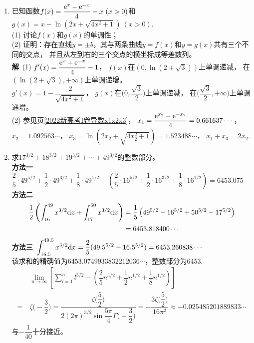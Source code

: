 \begin{enumerate}[label={\textbf{\arabic*.}},leftmargin=
    \inteval{\myenumleftmargin}pt]
\item 已知函数$f(x)=\dfrac{\mathrm{e}^x-\mathrm{e}^{-x}}{4}-x\ (x>0) $和
$ g(x)=x-\ln(2x+\sqrt{4x^2+1})\ (x>0) $. \\
(1) 讨论$ f(x) $和$ g(x) $的单调性；\\
(2) 证明：存在直线$y=\pm b$，其与两条曲线$y=f(x)$和$y=g(x)$共有三个不同的交点，
并且从左到右的三个交点的横坐标成等差数列。\\
\textbf{解}\ (1) $ f'(x)=\dfrac{\mathrm{e}^x+\mathrm{e}^{-x}}{4}-1 $，
$ f(x) $在$ (0,\ln(2+\sqrt{3})) $上单调递减，
在$ (\ln(2+\sqrt{3}),+\infty) $上单调递增。\\
$ g'(x)=1-\dfrac{2}{\sqrt{4x^2+1}} $，
$ g(x) $在$ \Big(0,\dfrac{\sqrt{3}}{2}\Big) $上单调递减，
在$ \Big(\dfrac{\sqrt{3}}{2},+\infty\Big) $上单调递增。\\
(2) 参见\pageref{2022新高考I卷导数x1x2x3}页\ref{2022新高考I卷导数x1x2x3}，
$ x_1=\dfrac{\mathrm{e}^{x_2}-\mathrm{e}^{-x_2}}{4}=0.661637\cdots $，\\
$ x_2=1.092563\cdots $，
$ x_3=\ln(2x_2+\sqrt{4x_2^2+1})=1.523488\cdots $，
$ x_1+x_3=2x_2 $.

\item 求$ 17^{3/2}+18^{3/2}+19^{3/2}+\cdots + 49^{3/2} $的整数部分。
\ifteach \\ 
\textbf{方法一}\ 
$ \dfrac{2}{5}\cdot 49^{5/2}+\dfrac{1}{2}\cdot 49^{3/2}+\dfrac{1}{8}
\cdot 49^{1/2}-\left(
\dfrac{2}{5}\cdot 16^{5/2}+\dfrac{1}{2}\cdot 16^{3/2}+\dfrac{1}{8}\cdot 16^{1/2}\right)=6453.075 $  \\
\textbf{方法二}\ 
\begin{align*}
    \dfrac{1}{2}\left(\int_{16}^{49}x^{3/2}\mathrm{d} x+\int_{17}^{50}x^{3/2}
    \mathrm{d} x \right) &= \dfrac{1}{5}\left( 49^{5/2} -16^{5/2}+50^{5/2}-17^{5/2} 
    \right)\\ &= 6453.818400 \cdots
\end{align*}
\textbf{方法三}\ $ \displaystyle \int_{16.5}^{49.5}x^{3/2}\mathrm{d} x=
\dfrac{2}{5}(49.5^{5/2}-16.5^{5/2})=6453.260838 \cdots $ \\
该求和的精确值为$ 6453.0749933832212036\cdots $，整数部分为6453. \\
\begin{align*}
    &\ \lim\limits_{n\to \infty} \left[ \sum\limits_{l=1}^{n} l^{3/2}-
     \left(\dfrac{2}{5}n^{5/2}+\dfrac{1}{2}n^{1/2}+\dfrac{1}{8}n^{1/2}
     \right)\right]\\ 
     =&\ \zeta\Big(-\dfrac{3}{2}\Big)=\dfrac{\zeta\Big(\dfrac{5}{2}\Big)}
    {2(2\pi)^{3/2}\sin\dfrac{5\pi}{4}\Gamma\Big(-\dfrac{3}{2}\Big)}
    =-\dfrac{3\zeta\Big(\dfrac{5}{2}\Big)}{16\pi^2} \approx -0.025485201889833\cdots
\end{align*}
与$ -\dfrac{1}{40} $十分接近。
\fi


\end{enumerate}
